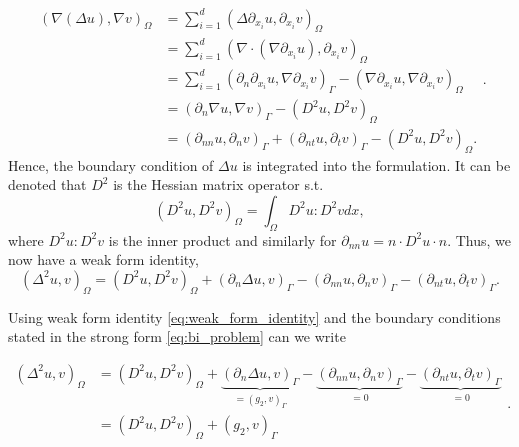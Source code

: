 \begin{equation*}
    \begin{split}
\left( \nabla \left( \Delta u \right) , \nabla v \right) _{\Omega } & = \sum_{i = 1}^{ d}  \left( \Delta  \partial _{x_{i}} u, \partial _{x_{i}}v \right) _{\Omega }  \\
&= \sum_{i = 1}^{d}  \left( \nabla \cdot \left( \nabla \partial _{x_{i}} u \right) , \partial _{x_{i}} v \right)_{\Omega }  \\
&= \sum_{i = 1}^{d}  \left( \partial_n  \partial _{x_{i}} u, \nabla  \partial _{x_{i}} v \right) _{\Gamma } -   \left( \nabla \partial _{x_{i}} u, \nabla \partial _{x_{i}} v \right)_{\Omega }  \\
&= \left(  \partial_n\nabla u, \nabla v \right) _{\Gamma  } - \left( D^2 u, D^2v \right) _{\Omega } \\
&= \left( \partial _{nn} u, \partial _{n} v  \right)_{\Gamma  }   + \left( \partial _{nt} u, \partial _{t} v \right) _{\Gamma  } - \left( D^2u, D^2v \right) _{\Omega } .
    \end{split}
.\end{equation*}
Hence, the boundary condition of $\Delta u$ is integrated into the formulation.  It can be denoted that $D^2$ is the Hessian matrix operator s.t.
$$( D^2u, D^2v )_{\Omega } = \int_{\Omega }^{} D^{2}u : D^2v  dx,$$
where $D^2u:D^2v$ is the inner product and similarly for $\partial _{nn} u = n\cdot D^2 u \cdot n$. Thus, we now have a weak form identity,
\begin{equation}
\label{eq:weak_form_identity}
\left( \Delta ^2 u, v \right) _{ \Omega } = \left( D^2u, D^2v \right) _{\Omega} +   \left( \partial _{n} \Delta u, v  \right) _{\Gamma  }  - (\partial _{nn} u, \partial _{n} v )_{\Gamma  } - \left( \partial _{nt} u, \partial _{t}v
\right) _{\Gamma  }
.\end{equation}

Using weak form identity \eqref{eq:weak_form_identity} and the boundary conditions stated in the strong form \eqref{eq:bi_problem} can we write

\begin{equation}
\begin{split}
\left( \Delta ^2 u, v \right) _{ \Omega } & = \left( D^2u, D^2v \right) _{\Omega} +   \underbrace{\left( \partial _{n} \Delta u, v  \right) _{\Gamma  }}_{ = \left( g_{2},v \right) _{\Gamma  }}   - \underbrace{(\partial _{nn} u, \partial
    _{n} v )_{\Gamma  }}_{ = 0}  - \underbrace{\left( \partial _{nt} u, \partial _{t}v \right) _{\Gamma  }}_{ = 0} \\
    &= \left( D^2u, D^2v \right) _{\Omega } + \left( g_{2},v \right) _{\Gamma  }  \\
\end{split}
.\end{equation}

